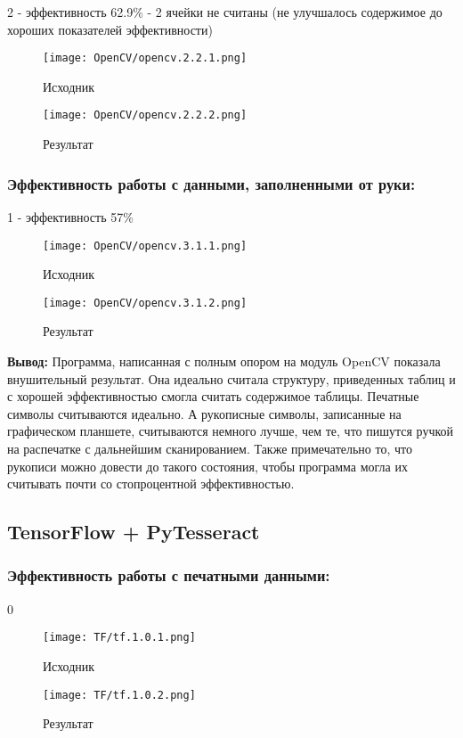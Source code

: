 \documentclass[a4paper, 12pt]{report}
\begin{document}
2 - эффективность 62.9\% - 2 ячейки не считаны (не улучшалось содержимое до хороших показателей эффективности)
\begin{figure}[ht]
    \centering
    \texttt{[image: OpenCV/opencv.2.2.1.png]}
    \caption{Исходник}
    \label{fig:my_label}
\end{figure}
\begin{figure}[ht]
    \centering
    \texttt{[image: OpenCV/opencv.2.2.2.png]}
    \caption{Результат}
    \label{fig:my_label}
\end{figure}
\pagebreak

\subsubsection{Эффективность работы с данными, заполненными от руки:}

1 -  эффективность 57\%
\begin{figure}[ht]
    \centering
    \texttt{[image: OpenCV/opencv.3.1.1.png]}
    \caption{Исходник}
    \label{fig:my_label}
\end{figure}
\begin{figure}[ht]
    \centering
    \texttt{[image: OpenCV/opencv.3.1.2.png]}
    \caption{Результат}
    \label{fig:my_label}
\end{figure}

\textbf{Вывод:} Программа, написанная с полным опором на модуль OpenCV показала внушительный результат. Она идеально считала структуру, приведенных таблиц и с хорошей эффективностью смогла считать содержимое таблицы. Печатные символы считываются идеально. А рукописные символы, записанные на графическом планшете, считываются немного лучше, чем те, что пишутся ручкой на распечатке с дальнейшим сканированием. Также примечательно то, что рукописи можно довести до такого состояния, чтобы программа могла их считывать почти со стопроцентной эффективностью.
\pagebreak

\subsection{TensorFlow + PyTesseract}

\subsubsection{Эффективность работы с печатными данными:}
0
\begin{figure}[ht]
    \centering
    \texttt{[image: TF/tf.1.0.1.png]}
    \caption{Исходник}
    \label{fig:my_label}
\end{figure}
\begin{figure}[ht]
    \centering
    \texttt{[image: TF/tf.1.0.2.png]}
    \caption{Результат}
    \label{fig:my_label}
\end{figure}
\pagebreak
\end{document}
